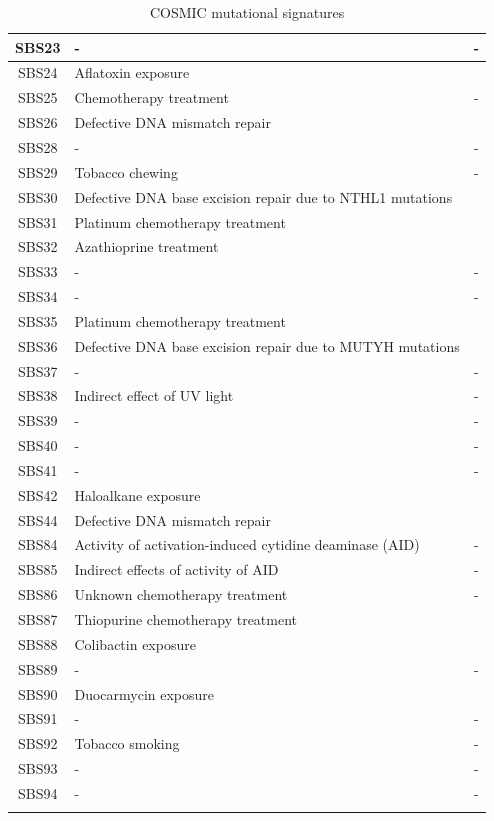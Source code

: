 \begin{longtable}{c|p{10cm}|c}
SBS23 & - & - \\ \hline
SBS24 & Aflatoxin exposure &  \cite{Chawanthayatham2017-oh} \\ \hline
SBS25 & Chemotherapy treatment & - \\ \hline
SBS26 & Defective DNA mismatch repair &  \cite{Meier2018-cj} \\ \hline
SBS28 & - & - \\ \hline
SBS29 & Tobacco chewing & - \\ \hline
SBS30 & Defective DNA base excision repair due to NTHL1 mutations &  \cite{Drost2017-xw} \\ \hline
SBS31 & Platinum chemotherapy treatment & \cite{Boot2018-gv} \\ \hline
SBS32 & Azathioprine treatment & \cite{Inman2018-fh} \\ \hline
SBS33 & - & - \\ \hline
SBS34 & - & - \\ \hline
SBS35 & Platinum chemotherapy treatment & \cite{Boot2018-gv} \\ \hline
SBS36 & Defective DNA base excision repair due to MUTYH mutations & \cite{Pilati2017-mx} \\ \hline
SBS37 & - &  - \\ \hline
SBS38 & Indirect effect of UV light & - \\ \hline
SBS39 & - & - \\ \hline
SBS40 & - & - \\ \hline
SBS41 & - & - \\ \hline
SBS42 & Haloalkane exposure &  \cite{Mimaki2016-kh} \\ \hline
SBS44 & Defective DNA mismatch repair & \cite{Drost2017-xw} \\ \hline
SBS84 & Activity of activation-induced cytidine deaminase (AID) & - \\ \hline
SBS85 & Indirect effects of activity of AID & - \\ \hline
SBS86 & Unknown chemotherapy treatment & - \\ \hline
SBS87 & Thiopurine chemotherapy treatment & \cite{Li2020-re} \\ \hline
SBS88 & Colibactin exposure &  \cite{Pleguezuelos-Manzano2020-er} \\ \hline
SBS89 & - & - \\ \hline
SBS90 & Duocarmycin exposure &  \cite{Boot2020-gg} \\ \hline
SBS91 & - & -\\ \hline
SBS92 & Tobacco smoking & - \\ \hline
SBS93 & - & - \\ \hline
SBS94 & - & - \\ \hline
\caption{COSMIC mutational signatures}
\end{longtable}
\endgroup

